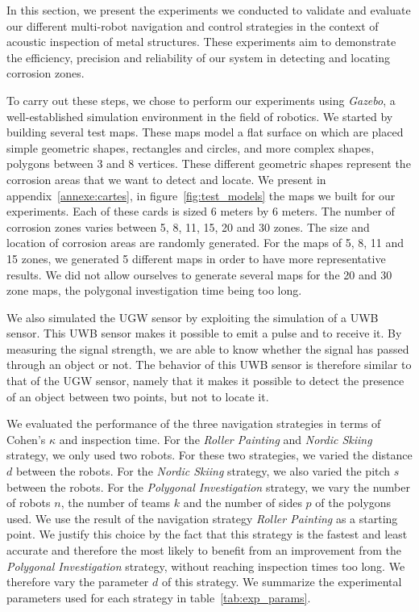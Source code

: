 In this section, we present the experiments we conducted to validate and evaluate our different multi-robot navigation and control strategies in the context of acoustic inspection of metal structures.
These experiments aim to demonstrate the efficiency, precision and reliability of our system in detecting and locating corrosion zones.

To carry out these steps, we chose to perform our experiments using \textit{Gazebo}, a well-established simulation environment in the field of robotics.
We started by building several test maps.
These maps model a flat surface on which are placed simple geometric shapes, rectangles and circles, and more complex shapes, polygons between 3 and 8 vertices.
These different geometric shapes represent the corrosion areas that we want to detect and locate.
We present in appendix~\ref{annexe:cartes}, in figure~\ref{fig:test_models} the maps we built for our experiments.
Each of these cards is sized 6 meters by 6 meters.
The number of corrosion zones varies between 5, 8, 11, 15, 20 and 30 zones.
The size and location of corrosion areas are randomly generated.
For the maps of 5, 8, 11 and 15 zones, we generated 5 different maps in order to have more representative results.
We did not allow ourselves to generate several maps for the 20 and 30 zone maps, the polygonal investigation time being too long.

We also simulated the UGW sensor by exploiting the simulation of a UWB sensor.
This UWB sensor makes it possible to emit a pulse and to receive it.
By measuring the signal strength, we are able to know whether the signal has passed through an object or not.
The behavior of this UWB sensor is therefore similar to that of the UGW sensor, namely that it makes it possible to detect the presence of an object between two points, but not to locate it.

We evaluated the performance of the three navigation strategies in terms of Cohen's $\kappa$ and inspection time.
For the \textit{Roller Painting} and \textit{Nordic Skiing} strategy, we only used two robots.
For these two strategies, we varied the distance $d$ between the robots.
For the \textit{Nordic Skiing} strategy, we also varied the pitch $s$ between the robots.
For the \textit{Polygonal Investigation} strategy, we vary the number of robots $n$, the number of teams $k$ and the number of sides $p$ of the polygons used.
We use the result of the navigation strategy \textit{Roller Painting} as a starting point.
We justify this choice by the fact that this strategy is the fastest and least accurate and therefore the most likely to benefit from an improvement from the \textit{Polygonal Investigation} strategy, without reaching inspection times too long.
We therefore vary the parameter $d$ of this strategy.
We summarize the experimental parameters used for each strategy in table~\ref{tab:exp_params}.

